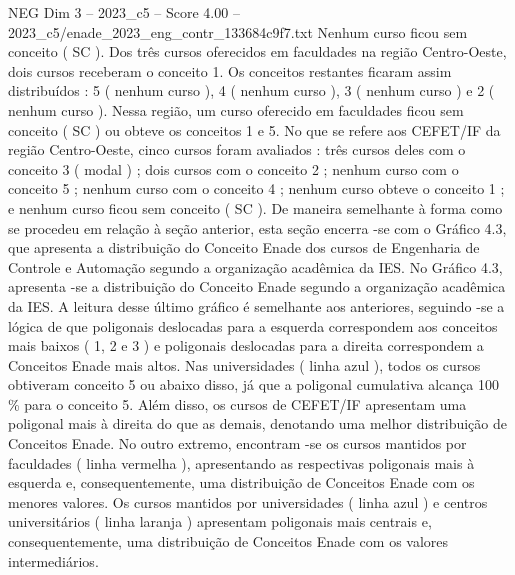 \begin{textsample}{NEG Dim 3 – 2023\_c5 – Score 4.00 – 2023\_c5/enade\_2023\_eng\_contr\_133684c9f7.txt}
Nenhum curso ficou sem conceito ( SC ).
Dos três cursos oferecidos em faculdades na região Centro-Oeste, dois cursos receberam o conceito 1.
Os conceitos restantes ficaram assim distribuídos : 5 ( nenhum curso ), 4 ( nenhum curso ), 3 ( nenhum curso ) e 2 ( nenhum curso ).
Nessa região, um curso oferecido em faculdades ficou sem conceito ( SC ) ou obteve os conceitos 1 e 5.
No que se refere aos CEFET/IF da região Centro-Oeste, cinco cursos foram avaliados : três cursos deles com o conceito 3 ( modal ) ; dois cursos com o conceito 2 ; nenhum curso com o conceito 5 ; nenhum curso com o conceito 4 ; nenhum curso obteve o conceito 1 ; e nenhum curso ficou sem conceito ( SC ).
De maneira semelhante à forma como se procedeu em relação à seção anterior, esta seção encerra -se com o Gráfico 4.3, que apresenta a distribuição do Conceito Enade dos cursos de Engenharia de Controle e Automação segundo a organização acadêmica da IES.
No Gráfico 4.3, apresenta -se a distribuição do Conceito Enade segundo a organização acadêmica da IES.
A leitura desse último gráfico é semelhante aos anteriores, seguindo -se a lógica de que poligonais deslocadas para a esquerda correspondem aos conceitos mais baixos ( 1, 2 e 3 ) e poligonais deslocadas para a direita correspondem a Conceitos Enade mais altos.
Nas universidades ( linha azul ), todos os cursos obtiveram conceito 5 ou abaixo disso, já que a poligonal cumulativa alcança 100 \% para o conceito 5.
Além disso, os cursos de CEFET/IF apresentam uma poligonal mais à direita do que as demais, denotando uma melhor distribuição de Conceitos Enade.
No outro extremo, encontram -se os cursos mantidos por faculdades ( linha vermelha ), apresentando as respectivas poligonais mais à esquerda e, consequentemente, uma distribuição de Conceitos Enade com os menores valores.
Os cursos mantidos por universidades ( linha azul ) e centros universitários ( linha laranja ) apresentam poligonais mais centrais e, consequentemente, uma distribuição de Conceitos Enade com os valores intermediários.

\end{textsample}

